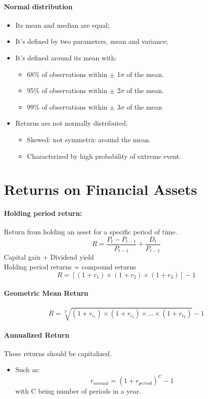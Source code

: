 \documentclass[11pt,a4paper]{report}
\begin{document}
\paragraph{Normal distribution}
\begin{itemize}
    \item Its mean and median are equal;
    \item It's defined by two parameters, mean and variance;
    \item It's defined around its mean with:
    \begin{itemize}
        \item 68\% of observations within $\pm$ 1$\sigma$ of the mean.
        \item 95\% of observations within $\pm$ 2$\sigma$ of the mean.
        \item 99\% of observations within $\pm$ 3$\sigma$ of the mean
    \end{itemize}
    \item Returns are not normally distributed.
    \begin{itemize}
        \item Skewed: not symmetric around the mean.
        \item Characterized by high probability of extreme event.
    \end{itemize}
\end{itemize}

\section{Returns on Financial Assets}
\paragraph{Holding period return:} Return from holding an asset for a specific period of time.
\[R = \frac{P_t - P_{t-1}}{P_{t-1}} + \frac{D_t}{P_{t-1}}\]
Capital gain + Dividend yield \\
Holding period returns = compound returns
\[R = [(1 + r_1) \times (1 + r_2) \times (1+r_3)] - 1 \]

\paragraph{Geometric Mean Return}
\[\overline{R} = \sqrt[T]{(1+r_{i_1}) \times (1+r_{i_2}) \times ... \times (1+r_{i_T})} - 1\]
\paragraph{Annualized Return} These returns should be capitalized.
\begin{itemize}
    \item Such as:
    \[ r_{annual} = (1+r_{period})^C - 1\] with C being number of periods in a year.
\end{itemize}
\end{document}
